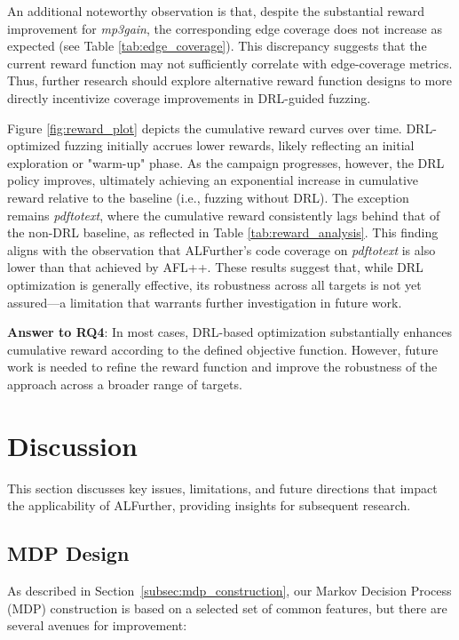 \documentclass[lettersize,journal]{IEEEtran}
\begin{document}
An additional noteworthy observation is that, despite the substantial reward improvement for \textit{mp3gain}, the corresponding edge coverage does not increase as expected (see Table \ref{tab:edge_coverage}). This discrepancy suggests that the current reward function may not sufficiently correlate with edge-coverage metrics. Thus, further research should explore alternative reward function designs to more directly incentivize coverage improvements in DRL-guided fuzzing.

Figure \ref{fig:reward_plot} depicts the cumulative reward curves over time. DRL-optimized fuzzing initially accrues lower rewards, likely reflecting an initial exploration or "warm-up" phase. As the campaign progresses, however, the DRL policy improves, ultimately achieving an exponential increase in cumulative reward relative to the baseline (i.e., fuzzing without DRL). The exception remains \textit{pdftotext}, where the cumulative reward consistently lags behind that of the non-DRL baseline, as reflected in Table \ref{tab:reward_analysis}. This finding aligns with the observation that ALFurther's code coverage on \textit{pdftotext} is also lower than that achieved by AFL++. These results suggest that, while DRL optimization is generally effective, its robustness across all targets is not yet assured—a limitation that warrants further investigation in future work.

\textbf{Answer to RQ4}: In most cases, DRL-based optimization substantially enhances cumulative reward according to the defined objective function. However, future work is needed to refine the reward function and improve the robustness of the approach across a broader range of targets.





\section{Discussion}
This section discusses key issues, limitations, and future directions that impact the applicability of ALFurther, providing insights for subsequent research.

\subsection{MDP Design}
As described in Section~\ref{subsec:mdp_construction}, our Markov Decision Process (MDP) construction is based on a selected set of common features, but there are several avenues for improvement:
\end{document}
